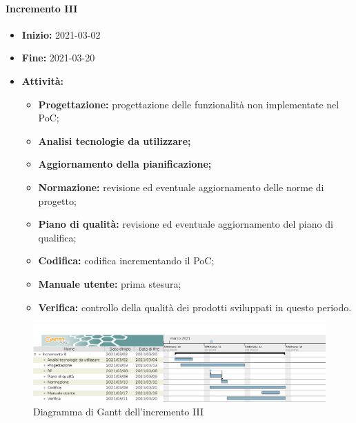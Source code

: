 \paragraph[Incremento III]{Incremento III}
\begin{itemize}
    \item [] \textbf{Inizio:} 2021-03-02
    \item [] \textbf{Fine:} 2021-03-20
    \item [] \textbf{Attività:}
          \begin{itemize}
              \item \textbf{Progettazione:} progettazione delle funzionalità non implementate nel PoC;
              \item \textbf{Analisi tecnologie da utilizzare;}
              \item \textbf{Aggiornamento della pianificazione;}
              \item \textbf{Normazione:} revisione ed eventuale aggiornamento delle norme di progetto;
              \item \textbf{Piano di qualità:} revisione ed eventuale aggiornamento del piano di qualifica;
              \item \textbf{Codifica:} codifica incrementando il PoC;
              \item \textbf{Manuale utente:} prima stesura;
              \item \textbf{Verifica:} controllo della qualità dei prodotti sviluppati in questo periodo.
          \end{itemize}
\end{itemize}

\begin{figure}[H]
    \centering
    \includegraphics[width=1\linewidth]{res/images/pianificazione/incremento_3.png}
    \caption{Diagramma di Gantt dell'incremento III}
    \label{fig:_Gantt incremento III}
\end{figure}

